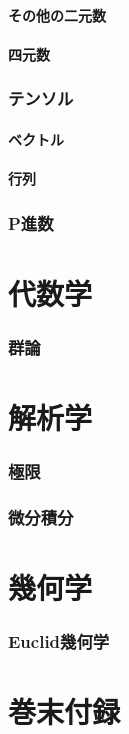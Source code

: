 \documentclass[hyperref,a4paper,12pt]{kininaruki}
\begin{document}
\subsection{その他の二元数}
\newpage
\subsection{四元数}
\newpage
\section{テンソル}
\subsection{ベクトル}
\newpage
\subsection{行列}
\newpage
\section{P進数}
\newpage
\part{代数学}
\newpage
\section{群論}
\newpage
\part{解析学}
\section{極限}
\newpage
\section{微分積分}
\newpage
\part{幾何学}
\section{Euclid幾何学}
\part{巻末付録}
\end{document}
